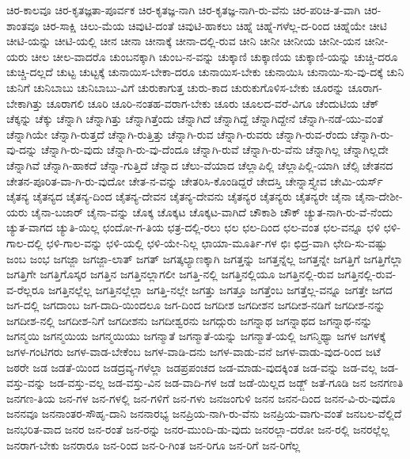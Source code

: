 {ಚಿರ-ಕಾಲವೂ
ಚಿರ-ಕೃತಜ್ಞತಾ-ಪೂರ್ವಕ
ಚಿರ-ಕೃತಜ್ಞ-ನಾಗಿ
ಚಿರ-ಕೃತಜ್ಞ-ನಾಗಿ-ರು-ವೆನು
ಚಿರ-ಪರಿಚಿ-ತ-ವಾಗಿ
ಚಿರ-ಶಾಂತವೂ
ಚಿರ-ಸಾಕ್ಷಿ
ಚಿಲು-ಮೆಯ
ಚಿವುಟಿ-ದಂತೆ
ಚಿವುಟಿ-ಹಾಕಲು
ಚಿಹ್ನೆ
ಚಿಹ್ನೆ-ಗಳೆಲ್ಲ-ದ-ರಿಂದ
ಚಿಹ್ನೆಯೇ
ಚೀಟಿ
ಚೀಟಿ-ಯನ್ನು
ಚೀಟಿ-ಯಲ್ಲಿ
ಚೀನ
ಚೀನಾ
ಚೀನಾಕ್ಕೆ
ಚೀನಾ-ದಲ್ಲಿ-ರುವ
ಚೀನಿ
ಚೀನೀ
ಚೀನೀಯ
ಚೀನೀ-ಯನ
ಚೀನೀ-ಯರು
ಚೀಲ
ಚೀಲ-ವಾದರೊ
ಚುಂಬನಕ್ಕಾಗಿ
ಚುಂಬ-ನ-ವನ್ನು
ಚುಕ್ಕಾಣಿ
ಚುಕ್ಕಾಣಿಯ
ಚುಕ್ಕಾಣಿ-ಯನ್ನು
ಚುಚ್ಚಿ-ದರೂ
ಚುಚ್ಚಿ-ದಲ್ಲದೆ
ಚುಟ್ಟ
ಚುಟ್ಟಕ್ಕೆ
ಚುನಾಯಿಸ-ಬೇಕಾ-ದರೂ
ಚುನಾಯಿಸ-ಬೇಕು
ಚುನಾಯಿಸಿ
ಚುನಾಯಿ-ಸು-ವು-ದಕ್ಕೆ
ಚುನಿ
ಚುನಿಗೆ
ಚುನಿಬಾಬು
ಚುನಿಬಾಬು-ವಿಗೆ
ಚುರುಕಾಗುತ್ತ
ಚುರು-ಕಾದ
ಚುರುಕುಗೊಳಿಸ-ಬೇಕು
ಚೂರನ್ನು
ಚೂರಾಗ-ಬೇಕಾಗಿತ್ತು
ಚೂರಾಗಲಿ
ಚೂರಿ
ಚೂರಿ-ನಂತಹ-ವರಾಗ-ಬೇಕು
ಚೂರು
ಚೂಲದ-ವರೆ-ವಿಗೂ
ಚೆಂದುಟಿಯ
ಚೆಕ್
ಚೆಕ್ಕನ್ನು
ಚೆಕ್ಕು
ಚೆನ್ನಾಗಿ
ಚೆನ್ನಾಗಿತ್ತು
ಚೆನ್ನಾಗಿತ್ತೆಂದು
ಚೆನ್ನಾಗಿದೆ
ಚೆನ್ನಾಗಿದ್ದೆ
ಚೆನ್ನಾಗಿದ್ದೇನೆ
ಚೆನ್ನಾಗಿ-ನಡೆ-ಯು-ವಂತೆ
ಚೆನ್ನಾಗಿಯೇ
ಚೆನ್ನಾಗಿ-ರುತ್ತದೆ
ಚೆನ್ನಾಗಿ-ರುತ್ತಿತ್ತು
ಚೆನ್ನಾಗಿ-ರುವ
ಚೆನ್ನಾಗಿ-ರುವರು
ಚೆನ್ನಾಗಿ-ರುವ-ರೆಂದು
ಚೆನ್ನಾಗಿ-ರು-ವು-ದನ್ನು
ಚೆನ್ನಾಗಿ-ರು-ವುದು
ಚೆನ್ನಾಗಿ-ರು-ವು-ದೆಂದೂ
ಚೆನ್ನಾಗಿ-ರುವೆ
ಚೆನ್ನಾಗಿ-ರು-ವೆನು
ಚೆನ್ನಾಗಿಲ್ಲ
ಚೆನ್ನಾಗಿಲ್ಲದೇ
ಚೆನ್ನಾಗಿವೆ
ಚೆನ್ನಾಗಿ-ಹಾಕದೆ
ಚೆನ್ನಾ-ಗುತ್ತಿದೆ
ಚೆನ್ನಾದ
ಚೆಲು-ವೆಯಾದ
ಚೆಲ್ಲಾಪಿಲ್ಲಿ
ಚೆಲ್ಲಾಪಿಲ್ಲಿ-ಯಾಗಿ
ಚೆಲ್ಸಿ
ಚೇತನದ
ಚೇತನ-ಪೂರಿತ-ವಾ-ಗಿ-ರು-ವುದೋ
ಚೇತ-ನ-ವನ್ನು
ಚೇತರಿಸಿ-ಕೊಂಡಿದ್ದರೆ
ಚೇದಸ್ತಿ
ಚೇನ್ನಾಸ್ತ್ಯೇವ
ಚೇಮಿ-ಯರ್ಸ್
ಚೈತನ್ಯ
ಚೈತನ್ಯದ
ಚೈತನ್ಯ-ದಿಂದ
ಚೈತನ್ಯ-ದೇವನ
ಚೈತನ್ಯ-ದೇವನು
ಚೈತನ್ಯರ
ಚೈತನ್ಯರು
ಚೈತನ್ಯರೇ
ಚೈನಾ
ಚೈನಾ-ದೇಶೀ-ಯರು
ಚೈನಾ-ಬಜಾರ್
ಚೈನಾ-ವನ್ನು
ಚೊಕ್ಕ
ಚೊಕ್ಕಟ
ಚೊಕ್ಕಟ-ವಾಗಿದೆ
ಚೌಕಾಶಿ
ಚೌಕ್
ಚ್ಯುತ-ನಾಗಿ-ರು-ವೆ-ನೆಂದು
ಚ್ಯುತ-ವಾಗದ
ಚ್ಯುತಿ-ಯಿಲ್ಲ
ಛಂದೋ-ಗ-ತಿಯ
ಛತ್ರ-ದಲ್ಲಿ-ರಲು
ಛಲ
ಛಲ-ದಿಂದ
ಛಲ-ವಂತ
ಛಲ-ವನ್ನೂ
ಛಳಿ
ಛಳಿ-ಗಾಲ-ದಲ್ಲಿ
ಛಳಿ-ಗಾಲ-ವನ್ನು
ಛಳಿ-ಯಲ್ಲಿ
ಛಳಿ-ಯೇ-ನಿಲ್ಲ
ಛಾಯಾ-ಮೂರ್ತಿ-ಗಳ
ಛಿಃ
ಛಿದ್ರ-ವಾಗಿ
ಛೇದಿ-ಸು-ವಷ್ಟು
ಜಂಬ
ಜಂಭ
ಜಗಜ್ಜಾ
ಜಗಜ್ಜಾ-ಲಾತ್
ಜಗತ್
ಜಗತ್ಕಲ್ಯಾಣಕ್ಕಾಗಿ
ಜಗತ್ತನ್ನು
ಜಗತ್ತನ್ನೆಲ್ಲ
ಜಗತ್ತನ್ನೇ
ಜಗತ್ತಿಗೆ
ಜಗತ್ತಿಗೆಲ್ಲಾ
ಜಗತ್ತಿಗೇ
ಜಗತ್ತಿಗೊಸ್ಕರ
ಜಗತ್ತಿನ
ಜಗತ್ತಿನಲ್ಲಾಗಲೀ
ಜಗತ್ತಿ-ನಲ್ಲಿ
ಜಗತ್ತಿನಲ್ಲಿಯೂ
ಜಗತ್ತಿನಲ್ಲಿ-ರುವ
ಜಗತ್ತಿನಲ್ಲಿ-ರುವ-ವ-ರೆಲ್ಲರೂ
ಜಗತ್ತಿನಲ್ಲೆಲ್ಲ
ಜಗತ್ತಿನಲ್ಲೆಲ್ಲಾ
ಜಗತ್ತಿ-ನಲ್ಲೇ
ಜಗತ್ತು
ಜಗತ್ತೂ
ಜಗತ್ತೆಂಬ
ಜಗತ್ತೆಲ್ಲ-ವನ್ನೂ
ಜಗತ್ತೇ
ಜಗದ
ಜಗ-ದಲ್ಲಿ
ಜಗದಾಂಬ
ಜಗ-ದಾದಿ-ಯಿಂದಲೂ
ಜಗ-ದಿಂದ
ಜಗದೀಶ
ಜಗದೀಶನ
ಜಗದೀಶ-ನಡಿಗೆ
ಜಗದೀಶ-ನನ್ನು
ಜಗದೀಶ-ನಲ್ಲಿ
ಜಗದೀಶ-ನಿಗೆ
ಜಗದೀಶನು
ಜಗದೀಶ್ವರನು
ಜಗದ್ಗುರು
ಜಗನ್ನಾಥ
ಜಗನ್ನಾಥದ
ಜಗನ್ನಾಥ-ನನ್ನು
ಜಗನ್ಮಯಿ
ಜಗನ್ಮಯಿಯ
ಜಗನ್ಮಯಿಯು
ಜಗನ್ಮಾತೆ
ಜಗನ್ಮಾತೆ-ಯನ್ನು
ಜಗನ್ಮಾತೆ-ಯಲ್ಲಿ
ಜಗನ್ಮಿಥ್ಯಾ
ಜಗಳ
ಜಗಳಕ್ಕೆ
ಜಗಳ-ಗಂಟಿಗರು
ಜಗಳ-ವಾಡ-ಬೇಕೆಂಬ
ಜಗಳ-ವಾಡಿ-ದನು
ಜಗಳ-ವಾಡು-ವನೆ
ಜಗಳ-ವಾಡು-ವುದ-ರಿಂದ
ಜಟೆ
ಜಠರೇ
ಜಡ
ಜಡತೆ-ಯಿಂದ
ಜಡದ್ರವ್ಯ-ಗಳೆಲ್ಲಾ
ಜಡಪ್ರಪಂಚದ
ಜಡ-ಮಾಡು-ವುದಕ್ಕಿಂತ
ಜಡ-ವನ್ನು
ಜಡ-ವಲ್ಲ
ಜಡ-ವಸ್ತು-ವನ್ನು
ಜಡ-ವಸ್ತು-ವಲ್ಲ
ಜಡ-ವಸ್ತು-ವಿನ
ಜಡ-ವಾದಿ-ಗಳ
ಜಡೆ
ಜಡೆ-ಯಿಲ್ಲದ
ಜಡ್ಜ್
ಜತೆ-ಗೂಡಿ
ಜನ
ಜನಗಣತಿ
ಜನಗಣ-ತಿಯ
ಜನ-ಗಳ
ಜನ-ಗಳಲ್ಲಿ
ಜನ-ಗಳಿಗೆ
ಜನ-ಗಳು
ಜನಜಂಗುಳಿ
ಜನನ
ಜನನ-ದಿಂದ
ಜನನ-ವಿ-ರು-ವುದೊ
ಜನನವೂ
ಜನನಾಂತರ-ಸೌಹೃ-ದಾನಿ
ಜನನಾರಭ್ಯ
ಜನಪ್ರಿಯ-ನಾಗಿ-ರು-ವೆನು
ಜನಪ್ರಿಯ-ವಾಗು-ವಂತೆ
ಜನಬಲ-ವೆಲ್ಲಿದೆ
ಜನಭರಿತ-ವಾದ
ಜನರ
ಜನ-ರಂತೆ
ಜನ-ರನ್ನು
ಜನರ-ಮುಂದಿ-ಡು-ವುದು
ಜನರಲ್ಲಾ-ದರೋ
ಜನ-ರಲ್ಲಿ
ಜನರಲ್ಲೆಲ್ಲ
ಜನರಾಗ-ಬೇಕು
ಜನರಾರೂ
ಜನ-ರಿಂದ
ಜನ-ರಿ-ಗಿಂತ
ಜನ-ರಿಗೂ
ಜನ-ರಿಗೆ
ಜನ-ರಿಗೆಲ್ಲ
}
